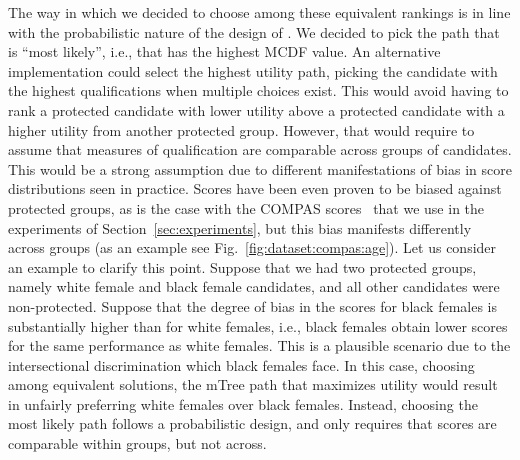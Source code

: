The way in which we decided to choose among these equivalent rankings is in line with the probabilistic nature of the design of \algoFAIR.
%
We decided to pick the path that is ``most likely'', i.e., that has the highest MCDF value.
%
An alternative implementation could select the highest utility path, picking the candidate with the highest qualifications when multiple choices exist.
%
This would avoid having to rank a protected candidate with lower utility above a protected candidate with a higher utility from another protected group.
%
However, that would require to assume that measures of qualification are comparable across groups of candidates.
%
This would be a strong assumption due to different manifestations of bias in score distributions seen in practice.
%
Scores have been even proven to be biased against protected groups, as is the case with the COMPAS scores~\cite{angwin_2016_machine} that we use in the experiments of Section~\ref{sec:experiments}, but this bias manifests differently across groups (as an example see Fig.~\ref{fig:dataset:compas:age}).
%
Let us consider an example to clarify this point.
%
Suppose that we had two protected groups, namely white female and black female candidates, and all other candidates were non-protected.
%
%
Suppose that the degree of bias in the scores for black females is substantially higher than for white females, i.e., black females obtain lower scores for the same performance as white females. This is a plausible scenario due to the intersectional discrimination which black females face.
%
In this case, choosing among equivalent solutions, the mTree path that maximizes utility would result in unfairly preferring white females over black females.
%
Instead, choosing the most likely path follows a probabilistic design, and only requires that scores are comparable within groups, but not across.
